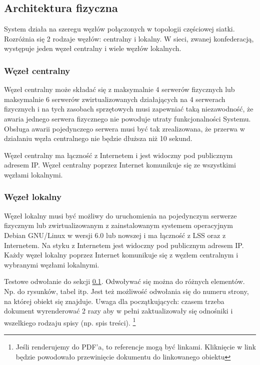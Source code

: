 \documentclass[a4paper]{article}
\begin{document}
\subsection{Architektura fizyczna}
\label{sec:arch_fiz}

System działa na szeregu węzłów połączonych w topologii częściowej siatki. Rozróżnia się 2 rodzaje węzłów: centralny i lokalny. W sieci, zwanej konfederacją, występuje jeden węzeł centralny i wiele węzłów lokalnych. 

\subsubsection{Węzeł centralny}
Węzeł centralny może składać się z maksymalnie 4 serwerów fizycznych lub maksymalnie 6 serwerów zwirtualizowanych działających na 4 serwerach fizycznych i na tych zasobach sprzętowych musi zapewniać taką 
niezawodność, że awaria jednego serwera fizycznego nie powoduje utraty funkcjonalności Systemu. Obsługa
awarii pojedynczego serwera musi być tak zrealizowana, że przerwa w działaniu węzła centralnego nie będzie dłuższa niż 10 sekund.

Węzeł centralny ma łączność z Internetem i jest widoczny pod publicznym adresem IP. Węzeł centralny poprzez Internet komunikuje się ze wszystkimi węzłami lokalnymi.

\subsubsection{Węzeł lokalny}
Węzeł lokalny musi być możliwy do uruchomienia na pojedynczym serwerze fizycznym lub zwirtualizowanym z zainstalowanym systemem operacyjnym Debian GNU/Linux w wersji 6.0 lub nowszej i ma łączność z LSS oraz z Internetem. Na styku z Internetem jest widoczny pod publicznym adresem IP. Każdy węzeł lokalny poprzez Internet komunikuje się z węzłem centralnym i wybranymi węzłami lokalnymi.  

Testowe odwołanie do sekcji \ref{sec:arch_fiz}. Odwoływać się można do różnych elementów. Np. do rysunków, tabel itp. Jest też możliwość odwołania się do numeru strony, na której obiekt się znajduje. Uwaga dla początkujących: czasem trzeba dokument wyrenderować 2 razy aby w pełni zaktualizowały się odnośniki i wszelkiego rodzaju spisy (np. spis treści).
\footnote{Jeśli renderujemy do PDF'a, to referencje mogą być linkami. Kliknięcie w link będzie powodowało przewinięcie dokumentu do linkowanego obiektu}
\end{document}
